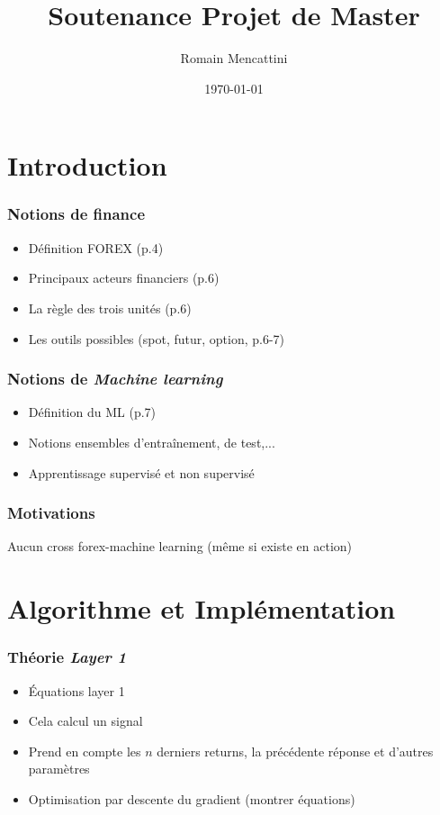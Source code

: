 \documentclass{beamer}
\title{Soutenance Projet de Master}
\author{Romain Mencattini}
\institute{Université de Genève}
\date{\today}
\begin{document}
  \begin{frame}
  \titlepage
  \end{frame}

	\section{Introduction} %
	
	\begin{frame}
		\frametitle{Notions de finance}
		\begin{itemize}
			\item Définition FOREX (p.4)
			\item Principaux acteurs financiers (p.6)
			\item La règle des trois unités (p.6)
			\item Les outils possibles (spot, futur, option, p.6-7)
		\end{itemize}
	\end{frame}

	\begin{frame}
		\frametitle{Notions de \textit{Machine learning}}
		\begin{itemize}
			\item Définition du ML (p.7)
			\item Notions ensembles d'entraînement, de test,...
			\item Apprentissage supervisé et non supervisé
		\end{itemize}
	\end{frame}

	\begin{frame}
		\frametitle{Motivations}
		Aucun cross forex-machine learning (même si existe en action)
	\end{frame}
	
	\section{Algorithme et Implémentation}
	
	\begin{frame}
		\frametitle{Théorie \textit{Layer 1}}
		\begin{itemize}
			\item Équations layer 1
			\item Cela calcul un signal
			\item Prend en compte les $n$ derniers returns, la précédente réponse et d'autres paramètres
			\item Optimisation par descente du gradient (montrer équations)
		\end{itemize}
	\end{frame}
\end{document}
